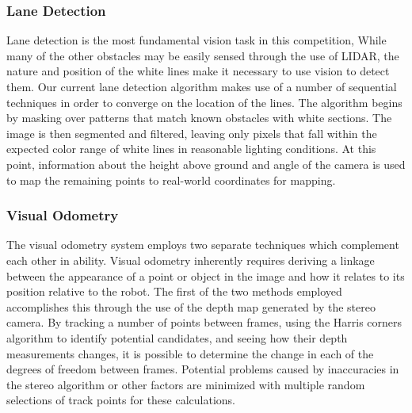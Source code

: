 \subsubsection*{Lane Detection}
Lane detection is the most fundamental vision task in this competition, While many of the other obstacles may be easily sensed through the use of LIDAR, the nature and position of the white lines make it necessary to use vision to detect them. Our current lane detection algorithm makes use of a number of sequential techniques in order to converge on the location of the lines. The algorithm begins by masking over patterns that match known obstacles with white sections. The image is then segmented and filtered, leaving only pixels that fall within the expected color range of white lines in reasonable lighting conditions. At this point, information about the height above ground and angle of the camera is used to map the remaining points to real-world coordinates for mapping.

\subsubsection*{Visual Odometry}
The visual odometry system employs two separate techniques which complement each other in ability. Visual odometry inherently requires deriving a linkage between the appearance of a point or object in the image and how it relates to its position relative to the robot. The first of the two methods employed accomplishes this through the use of the depth map generated by the stereo camera. By tracking a number of points between frames, using the Harris corners algorithm to identify potential candidates, and seeing how their depth measurements changes, it is possible to determine the change in each of the degrees of freedom between frames. Potential problems caused by inaccuracies in the stereo algorithm or other factors are minimized with multiple random selections of track points for these calculations. 

